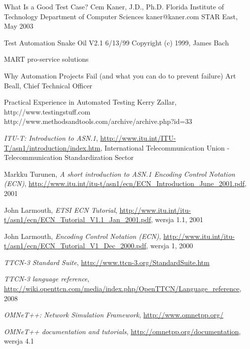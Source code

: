\documentclass[00-praca-magisterska.tex]{subfiles}
\begin{document}
\begin{thebibliography}{9}

What Is a Good Test Case?
Cem Kaner, J.D., Ph.D.
Florida Institute of Technology
Department of Computer Sciences
kaner@kaner.com
STAR East, May 2003

Test Automation Snake Oil
V2.1 6/13/99
Copyright (c) 1999, James Bach

MART pro-service solutions

Why Automation Projects Fail
(and what you can do to prevent failure)
Art Beall, Chief Technical Officer

Practical Experience in Automated Testing
Kerry Zallar, http://www.testingstuff.com
http://www.methodsandtools.com/archive/archive.php?id=33





  \emph{ITU-T: Introduction to ASN.1},
  \url{http://www.itu.int/ITU-T/asn1/introduction/index.htm},
  International Telecommunication Union - Telecommunication Standardization Sector

  Markku Turunen,
  \emph{A short introduction to ASN.1 Encoding Control Notation (ECN)},
  \url{http://www.itu.int/itu-t/asn1/ecn/ECN_Introduction_June_2001.pdf},
  2001

  John Larmouth,
  \emph{ETSI ECN Tutorial},
  \url{http://www.itu.int/itu-t/asn1/ecn/ECN_Tutorial_V1.1_Jan_2001.pdf},
  wersja 1.1,
  2001

  John Larmouth,
  \emph{Encoding Control Notation (ECN)},
  \url{http://www.itu.int/itu-t/asn1/ecn/ECN_Tutorial_V1_Dec_2000.pdf},
  wersja 1, 
  2000

  \emph{TTCN-3 Standard Suite},
  \url{http://www.ttcn-3.org/StandardSuite.htm}

  \emph{TTCN-3 language reference},
  \url{http://wiki.openttcn.com/media/index.php/OpenTTCN/Language_reference},
  2008

  \emph{OMNeT++: Network Simulation Framework},
  \url{http://www.omnetpp.org/}

  \emph{OMNeT++ documentation and tutorials},
  \url{http://omnetpp.org/documentation},
  wersja 4.1


\end{thebibliography}
\end{document}
